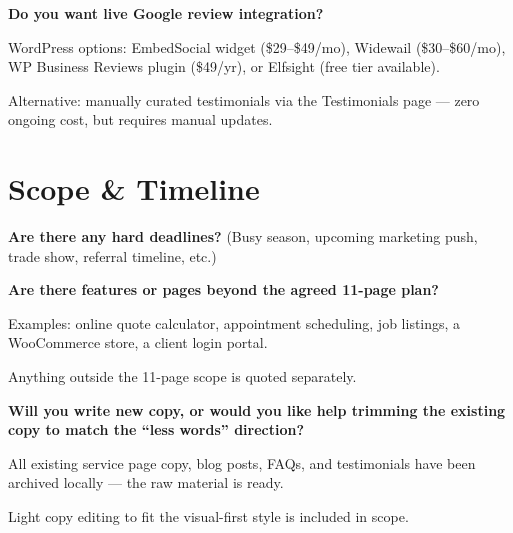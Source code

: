 \documentclass[11pt, letterpaper]{article}
\begin{document}
\begin{checklist}
  \item \textbf{Do you want live Google review integration?}
    \begin{checklist}
      \item WordPress options: EmbedSocial widget (\$29--\$49/mo), Widewail
            (\$30--\$60/mo), WP Business Reviews plugin (\$49/yr), or Elfsight
            (free tier available).
      \item Alternative: manually curated testimonials via the Testimonials page
            --- zero ongoing cost, but requires manual updates.
    \end{checklist}
\end{checklist}

\section{Scope \& Timeline}

\begin{checklist}
  \item \textbf{Are there any hard deadlines?}
    (Busy season, upcoming marketing push, trade show, referral timeline, etc.)

  \item \textbf{Are there features or pages beyond the agreed 11-page plan?}
    \begin{checklist}
      \item Examples: online quote calculator, appointment scheduling, job listings,
            a WooCommerce store, a client login portal.
      \item Anything outside the 11-page scope is quoted separately.
    \end{checklist}

  \item \textbf{Will you write new copy, or would you like help trimming the
        existing copy to match the ``less words'' direction?}
    \begin{checklist}
      \item All existing service page copy, blog posts, FAQs, and testimonials
            have been archived locally --- the raw material is ready.
      \item Light copy editing to fit the visual-first style is included in scope.
    \end{checklist}
\end{checklist}
\end{document}
